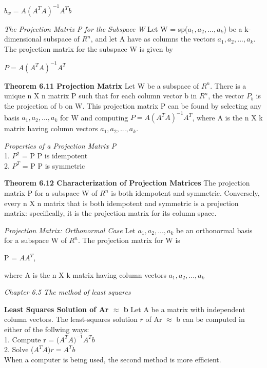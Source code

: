 \documentclass{article}
\begin{document}
\begin{center}

$b_w = A({A^T}A)^{-1} A^Tb$

\end{center}

\textit {The Projection Matrix P for the Subspace W} Let W = sp($a_1, a_2,...,a_k$) be a k-dimensional subspace of $R^n$, and let A have as columns the vectors $a_1, a_2,...,a_k$. The projection matrix for the subspace W is given by 

\begin{center}
$P = A(A^TA)^{-1}A^T$
\end{center}

\textbf {Theorem 6.11 Projection Matrix} Let W be a subspace of $R^n$. There is a unique n X n matrix P such that for each column vector b in $R^n$,  the vector $P_b$ is the projection of b on W. This projection matrix P can be found by selecting any basis {$a_1, a_2,...,a_k$} for W and computing $P = A(A^TA)^{-1}A^T$, where A is the n X k matrix having column vectors $a_1, a_2, ... , a_k$.

\textit {Properties of a Projection Matrix P} \\
1. $P^2$ = P             P is idempotent \\
2. $P^T$ = P 				  P is symmetric

\textbf {Theorem 6.12 Characterization of Projection Matrices } The projection matrix P for a subspace W of $R^n$ is both idempotent and symmetric. Conversely, every n X n matrix that is both idempotent and symmetric is a projection matrix: specifically, it is the projection matrix for its column space.

\textit {Projection Matrix: Orthonormal Case} Let {$a_1,a_2,...,a_k$} be an orthonormal basis for a subspace W of $R^n$. The projection matrix for W is 
\begin{center}
P = $AA^T$,
\end{center}

where A is the n X k matrix having column vectors $a_1, a_2,...,a_k$

\textit {Chapter 6.5 The method of least squares}

\textbf {Least Squares Solution of Ar $\approx$ b} Let A be a matrix with independent column vectors. The least-squares solution $\bar{r}$ of Ar $\approx$ b can be computed in either of the follwing ways: \\
1. Compute r = ($A^TA)^{-1}A^Tb$ \\
2. Solve ($A^TA)r = A^Tb$ \\
When a computer is being used, the second method is more efficient.
\end{document}
